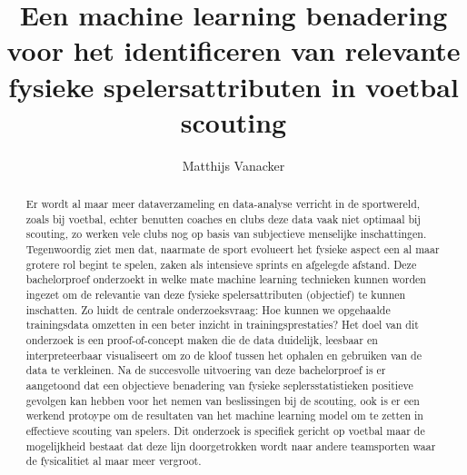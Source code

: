 \documentclass{hogent-article}
\title{Een machine learning benadering voor het identificeren van relevante fysieke spelersattributen in voetbal scouting}
\author{Matthijs Vanacker}
\begin{document}
\begin{abstract}
  Er wordt al maar meer dataverzameling en data-analyse verricht in de sportwereld, zoals bij voetbal, echter benutten coaches en clubs deze data vaak niet optimaal bij scouting, zo werken vele clubs nog op basis van subjectieve menselijke inschattingen. Tegenwoordig ziet men dat, naarmate de sport evolueert het fysieke aspect een al maar grotere rol begint te spelen, zaken als intensieve sprints en afgelegde afstand. Deze bachelorproef onderzoekt in welke mate machine learning technieken kunnen worden ingezet om de relevantie van deze fysieke spelersattributen (objectief) te kunnen inschatten. Zo luidt de centrale onderzoeksvraag: Hoe kunnen we opgehaalde trainingsdata omzetten in een beter inzicht in trainingsprestaties? Het doel van dit onderzoek is een proof-of-concept maken die de data duidelijk, leesbaar en interpreteerbaar visualiseert om zo de kloof tussen het ophalen en gebruiken van de data te verkleinen. 
  Na de succesvolle uitvoering van deze bachelorproef is er aangetoond dat een objectieve benadering van fysieke seplersstatistieken positieve gevolgen kan hebben voor het nemen van beslissingen bij de scouting, ook is er een werkend protoype om de resultaten van het machine learning model om te zetten in effectieve scouting van spelers. Dit onderzoek is specifiek gericht op voetbal maar de mogelijkheid bestaat dat deze lijn doorgetrokken wordt naar andere teamsporten waar de fysicalitiet al maar meer vergroot.
\end{abstract}

\tableofcontents



\printbibliography[heading=bibintoc]
\end{document}
